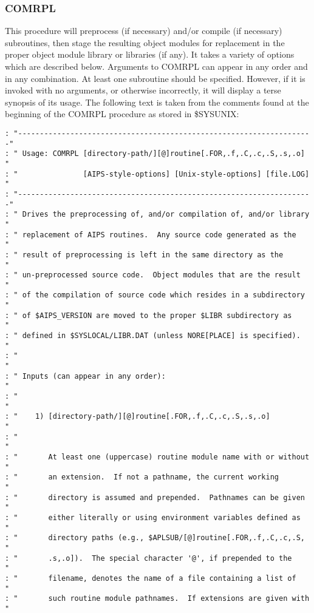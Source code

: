 \subsubsection{COMRPL}
This procedure will preprocess (if necessary) and/or compile (if
necessary) subroutines, then stage the resulting object modules for
replacement in the proper object module library or libraries (if any).
It takes a variety of options which are described below.  Arguments to
COMRPL can appear in any order and in any combination.  At least one
subroutine should be specified. However, if it is invoked with no
arguments, or otherwise incorrectly, it will display a terse synopsis
of its usage. The following text is taken from the comments found at
the beginning of the COMRPL procedure as stored in \$SYSUNIX:

\begin{verbatim}
: "--------------------------------------------------------------------"
: " Usage: COMRPL [directory-path/][@]routine[.FOR,.f,.C,.c,.S,.s,.o]  "
: "               [AIPS-style-options] [Unix-style-options] [file.LOG] "
: "--------------------------------------------------------------------"
: " Drives the preprocessing of, and/or compilation of, and/or library "
: " replacement of AIPS routines.  Any source code generated as the    "
: " result of preprocessing is left in the same directory as the       "
: " un-preprocessed source code.  Object modules that are the result   "
: " of the compilation of source code which resides in a subdirectory  "
: " of $AIPS_VERSION are moved to the proper $LIBR subdirectory as     "
: " defined in $SYSLOCAL/LIBR.DAT (unless NORE[PLACE] is specified).   "
: "                                                                    "
: " Inputs (can appear in any order):                                  "
: "                                                                    "
: "    1) [directory-path/][@]routine[.FOR,.f,.C,.c,.S,.s,.o]          "
: "                                                                    "
: "       At least one (uppercase) routine module name with or without "
: "       an extension.  If not a pathname, the current working        "
: "       directory is assumed and prepended.  Pathnames can be given  "
: "       either literally or using environment variables defined as   "
: "       directory paths (e.g., $APLSUB/[@]routine[.FOR,.f,.C,.c,.S,  "
: "       .s,.o]).  The special character '@', if prepended to the     "
: "       filename, denotes the name of a file containing a list of    "
: "       such routine module pathnames.  If extensions are given with "

\end{verbatim}
